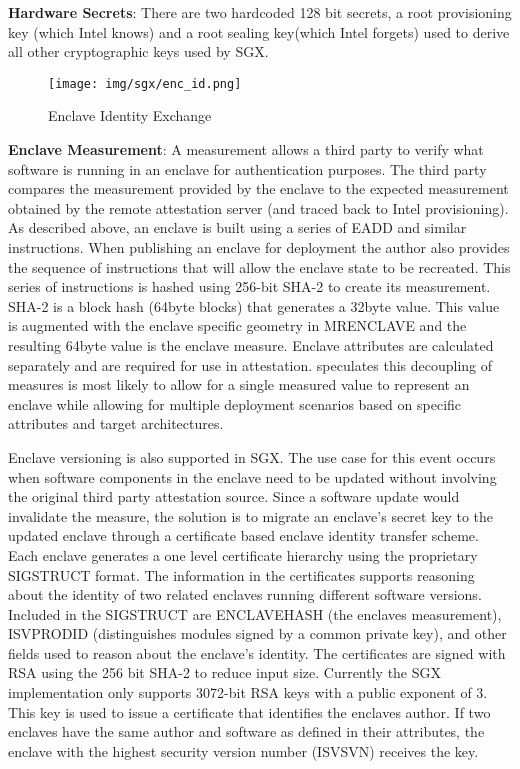 \textbf{Hardware Secrets}: There are two hardcoded 128 bit secrets, a root provisioning key (which Intel knows) and a root sealing key(which Intel forgets) used to derive all other cryptographic keys used by SGX. 
\begin{figure}[H]
\centering
\texttt{[image: img/sgx/enc\_id.png]}
\caption{Enclave Identity Exchange \protect\cite{Costan_Devadas_2016}}
\end{figure}


\textbf{Enclave Measurement}: A measurement allows a third party to verify what software is running in an enclave for authentication purposes. The third party compares the measurement provided by the enclave to the expected measurement obtained by the remote attestation server (and traced back to Intel provisioning). As described above, an enclave is built using a series of EADD and similar instructions. When publishing an enclave for deployment the author also provides the sequence of instructions that will allow the enclave state to be recreated. This series of instructions is hashed using 256-bit SHA-2 to create its measurement. SHA-2 is a block hash (64byte blocks) that generates a 32byte value. This value is augmented with the enclave specific geometry in MRENCLAVE and the resulting 64byte value is the enclave measure. Enclave attributes are calculated separately and are required for use in attestation. \cite{Costan_Devadas_2016} speculates this decoupling of measures is most likely to allow for a single measured value to represent an enclave while allowing for multiple deployment scenarios based on specific attributes and target architectures. 

Enclave versioning is also supported in SGX. The use case for this event occurs when software components in the enclave need to be updated without involving the original third party attestation source. Since a software update would invalidate the measure, the solution is to migrate an enclave's secret key to the updated enclave through a certificate based enclave identity transfer scheme. Each enclave generates a one level certificate hierarchy using the proprietary SIGSTRUCT format. The information in the certificates supports reasoning about the identity of two related enclaves running different software versions. Included in the SIGSTRUCT are ENCLAVEHASH (the enclaves measurement), ISVPRODID (distinguishes modules signed by a common private key), and other fields used to reason about the enclave's identity. The certificates are signed with RSA using the 256 bit SHA-2 to reduce input size. Currently the SGX implementation only supports 3072-bit RSA keys with a public exponent of 3. This key is used to issue a certificate that identifies the enclaves author. If two enclaves have the same author and software as defined in their attributes, the enclave with the highest security version number (ISVSVN) receives the key. 


